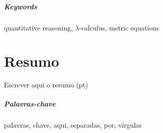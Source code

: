 \begin{comment}
On the semantic side, we show that the following categories satisfy the necessary requirements for interpreting this equation:
\begin{itemize}
    \item the category of metric spaces;
    \item the cocompletion of a $\catMet$-category $\catC$;
    \item the category $\catBan$ of Banach spaces and short maps;
    \item Selinger’s category \( \catQ \) of quantum operations (i.e., completely positive, trace-nonincreasing superoperators)~\cite{selinger2004towards};
    \item Cho’s category \( \WstarCPSUop \), the opposite of \( \WstarCPSU \), consisting of W$^*$-algebras and normal, completely positive, subunital maps.
\end{itemize}
This demonstrates the broad applicability of our approach across several domains.
\end{comment}




\paragraph{Keywords} quantitative reasoning, $\lambda$-calculus, metric equations

\cleardoublepage

\chapter*{Resumo}

Escrever aqui o resumo (pt)

\paragraph{Palavras-chave} palavras, chave, aqui, separadas, por, vírgulas

\cleardoublepage
